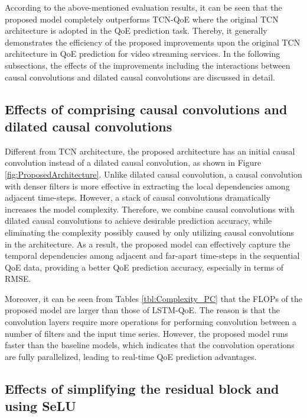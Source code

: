 According to the above-mentioned evaluation results, it can be seen that the proposed model completely outperforms TCN-QoE where the original TCN architecture is adopted in the QoE prediction task.
Thereby, it generally demonstrates the efficiency of the proposed improvements upon the original TCN architecture in QoE prediction for video streaming services.
In the following subsections, the effects of the improvements including the interactions between causal convolutions and dilated causal convolutions are discussed in detail.



\subsection{Effects of comprising causal convolutions and dilated causal convolutions}

Different from TCN \cite{Network_TCN} architecture, the proposed architecture has an initial causal convolution instead of a dilated causal convolution, as shown in Figure \ref{fig:ProposedArchitecture}.
Unlike dilated causal convolution, a causal convolution with denser filters is more effective in extracting the local dependencies among adjacent time-steps.
However, a stack of causal convolutions dramatically increases the model complexity.
Therefore, we combine causal convolutions with dilated causal convolutions to achieve desirable prediction accuracy, while eliminating the complexity possibly caused by only utilizing causal convolutions in the architecture.
As a result, the proposed model can effectively capture the temporal dependencies among adjacent and far-apart time-steps in the sequential QoE data, providing a better QoE prediction accuracy, especially in terms of RMSE.

Moreover, it can be seen from Tables \ref{tbl:Complexity_PC} that the FLOPs of the proposed model are larger than those of LSTM-QoE.
The reason is that the convolution layers require more operations for performing convolution between a number of filters and the input time series.
However, the proposed model runs faster than the baseline models, which indicates that the convolution operations are fully parallelized, leading to real-time QoE prediction advantages.




\subsection{Effects of simplifying the residual block and using SeLU}

